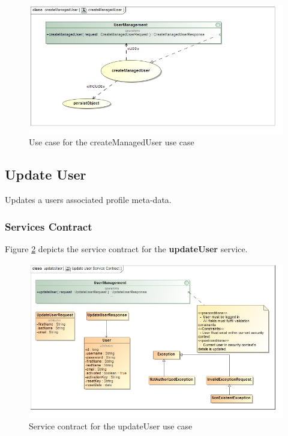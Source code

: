 \begin{figure}[H]
	\begin{center}
		\includegraphics[scale=0.55]{../Diagrams and Charts/Users/Create Managed User Use Case.jpg}
		\caption{Use case for the createManagedUser use case}
		\label{fig:createManagedUserUseCase}
	\end{center}
\end{figure}
\subsection{Update User}
Updates a users associated profile meta-data.

\subsubsection{Services Contract}
Figure \ref{fig:updateUserServicesContract} depicts the service contract for the \textbf{updateUser} service.

\begin{figure}[H]
  \begin{center}
  \includegraphics[scale=0.55]{../Diagrams and Charts/Users/Update User Service Contract.jpg}
  \caption{Service contract for the updateUser use case}
  \label{fig:updateUserServicesContract}
  \end{center}
\end{figure}

